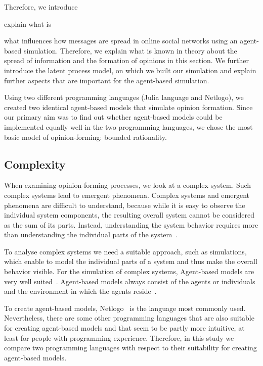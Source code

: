 \documentclass[runningheads]{llncs}
\begin{document}
Therefore, we introduce

explain what is

what influences how messages are spread in online social networks using
an agent-based simulation. Therefore, we explain what is known in theory
about the spread of information and the formation of opinions in this
section. We further introduce the latent process model, on which we
built our simulation and explain further aspects that are important for
the agent-based simulation.

Using two different programming languages (Julia language and Netlogo),
we created two identical agent-based models that simulate opinion
formation. Since our primary aim was to find out whether agent-based
models could be implemented equally well in the two programming
languages, we chose the most basic model of opinion-forming: bounded
rationality.

\hypertarget{complexity}{%
\subsection{Complexity}\label{complexity}}

When examining opinion-forming processes, we look at a complex system.
Such complex systems lead to emergent phenomena. Complex systems and
emergent phenomena are difficult to understand, because while it is easy
to observe the individual system components, the resulting overall
system cannot be considered as the sum of its parts. Instead,
understanding the system behavior requires more than understanding the
individual parts of the system~\autocite{Valdez2018human}.

To analyse complex systems we need a suitable approach, such as
simulations, which enable to model the individual parts of a system and
thus make the overall behavior visible. For the simulation of complex
systems, Agent-based models are very well suited~\autocite{Epstein2007}.
Agent-based models always consist of the agents or individuals and the
environment in which the agents
reside~\autocite{Bonabeau2002Agentbased}.

To create agent-based models, Netlogo~\autocite{Wilensky1999} is the
language most commonly used. Nevertheless, there are some other
programming languages that are also suitable for creating agent-based
models and that seem to be partly more intuitive, at least for people
with programming experience. Therefore, in this study we compare two
programming languages with respect to their suitability for creating
agent-based models.
\end{document}
